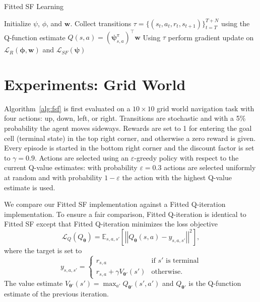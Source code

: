 \documentclass{article}
\newcommand{\norm}[1]{\left|\left|#1\right|\right|}
\begin{document}
\begin{algorithm}     
\caption{Fitted SF Learning}
\label{alg:fsf}     
\begin{algorithmic}
\STATE Initialize $\psi$, $\phi$, and $\pmb{w}$.
\LOOP 
\STATE Collect transitions $\tau = \{ (s_t,a_t,r_t,s_{t+1}) \}_{t=T}^{T+N}$ using the Q-function estimate $Q(s,a) = (\pmb{\psi}_{s,a}^\pi)^\top \pmb{w}$
\STATE Using $\tau$ perform gradient update on $\mathcal{L}_R(\pmb{\phi},\pmb{w})$ and $\mathcal{L}_{SF}(\pmb{\psi})$
\ENDLOOP
\end{algorithmic}
\end{algorithm}

\section{Experiments: Grid World}

Algorithm~\ref{alg:fsf} is first evaluated on a $10 \times 10$ grid world navigation task with four actions: up, down, left, or right.
Transitions are stochastic and with a 5\% probability the agent moves sideways.
Rewards are set to 1 for entering the goal cell (terminal state) in the top right corner, and otherwise a zero reward is given.
Every episode is started in the bottom right corner and the discount factor is set to $\gamma = 0.9$.
Actions are selected using an $\varepsilon$-greedy policy with respect to the current Q-value estimates: with probability $\varepsilon=0.3$ actions are selected uniformly at random and with probability $1 - \varepsilon$ the action with the highest Q-value estimate is used.

We compare our Fitted SF implementation against a Fitted Q-iteration implementation.
To ensure a fair comparison, Fitted Q-iteration is identical to Fitted SF except that Fitted Q-iteration minimizes the loss objective 
\begin{equation}
\mathcal{L}_Q(Q_{\pmb{\theta}}) = \mathbb{E}_{s,a,s'} \left[ \norm{ Q_{\pmb{\theta}}(s,a) - y_{s,a,s'} }^2 \right],
\end{equation}
where the target is set to 
\begin{equation}
y_{s,a,s'} = \begin{cases} r_{s,a} &\text{if $s'$ is terminal} \\ r_{s,a} + \gamma V_{\pmb{\theta}'}(s') & \text{otherwise.}\end{cases}
\end{equation}
The value estimate $V_{\pmb{\theta}'}(s') = \max_{a'} Q_{\pmb{\theta}'}(s',a')$ and $Q_{\pmb{\theta}'}$ is the Q-function estimate of the previous iteration.
\end{document}
